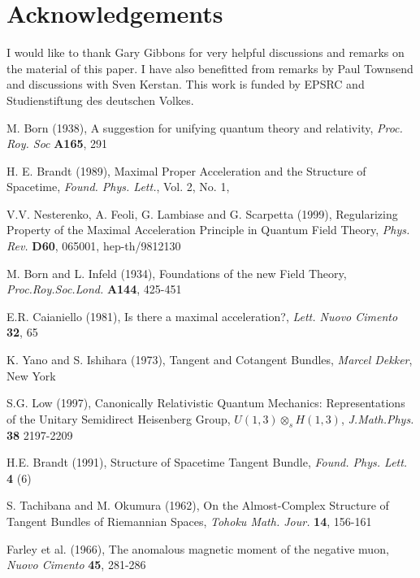 \documentclass[11pt,a4paper,twoside]{article}
\begin{document}
\section*{Acknowledgements}
I would like to thank Gary Gibbons for very helpful discussions and
remarks on the material of this paper. I have also benefitted from
remarks by Paul Townsend and discussions with Sven Kerstan.
This work is funded by EPSRC and Studienstiftung des deutschen Volkes.


\begin{thebibliography}{00}
 M. Born (1938), A suggestion for unifying quantum
theory and relativity, \textit{Proc. Roy. Soc} \textbf{A165}, 291

 H. E. Brandt (1989), Maximal Proper Acceleration
and the Structure of Spacetime, \textit{Found. Phys. Lett.}, Vol. 2, No. 1,

V.V. Nesterenko, A. Feoli, G. Lambiase and G. Scarpetta (1999),
Regularizing Property of the Maximal Acceleration Principle in
Quantum Field Theory, \textit{Phys. Rev.} \textbf{D60}, 065001,
hep-th/9812130

 M. Born and L. Infeld (1934), Foundations of the new
Field Theory,
\textit{Proc.Roy.Soc.Lond.} \textbf{A144}, 425-451

 E.R. Caianiello (1981), Is there a maximal
acceleration?, \textsl{Lett. Nuovo Cimento} \textbf{32}, 65

 K. Yano and S. Ishihara (1973), Tangent and Cotangent
Bundles, \textit{Marcel Dekker}, New York

 S.G. Low (1997), Canonically Relativistic Quantum
Mechanics: Representations of the Unitary Semidirect Heisenberg Group,
$U(1,3)\otimes_s H(1,3)$, \textit{J.Math.Phys.} \textbf{38} 2197-2209

 H.E. Brandt (1991), Structure of Spacetime Tangent
Bundle, \textit{Found. Phys. Lett.} \textbf{4} (6)

 S. Tachibana and M. Okumura (1962), On the
Almost-Complex Structure of Tangent Bundles of Riemannian Spaces,
\textit{Tohoku Math. Jour.} \textbf{14}, 156-161

 Farley et al. (1966), The anomalous magnetic moment
of the negative muon, \textit{Nuovo Cimento} \textbf{45}, 281-286


\end{thebibliography}
\end{document}
